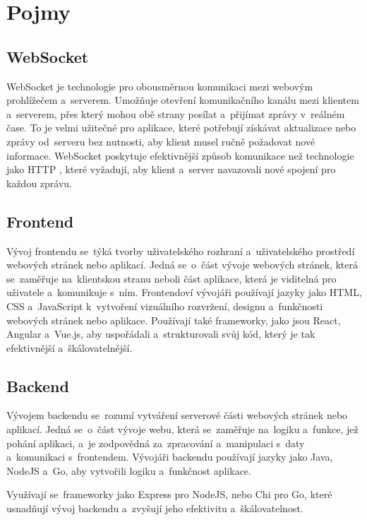 \setlength{\headheight}{15.04742pt}
\section{Pojmy}

\subsection{WebSocket}\label{websocket} WebSocket \cite{websocket} je technologie pro obousměrnou komunikaci mezi webovým prohlížečem a~serverem. Umožňuje otevření komunikačního kanálu mezi klientem a~serverem, přes který mohou obě strany posílat a~přijímat zprávy v~reálném čase. To je velmi užitečné pro aplikace, které potřebují získávat aktualizace nebo zprávy od~serveru bez nutnosti, aby klient musel ručně požadovat nové informace. WebSocket poskytuje efektivnější způsob komunikace než technologie jako HTTP \cite{httpVSwebsocket}, které vyžadují, aby klient a~server navazovali nové spojení pro každou zprávu.
\newpage
\subsection{Frontend} Vývoj frontendu se~týká tvorby uživatelského rozhraní a~uživatelského prostředí webových stránek nebo aplikací. Jedná se~o~část vývoje webových stránek, která se~zaměřuje na~klientskou stranu neboli část aplikace, která je viditelná pro uživatele a~komunikuje s~ním. Frontendoví vývojáři používají jazyky jako HTML, CSS a~JavaScript k~vytvoření vizuálního rozvržení, designu a~funkčnosti webových stránek nebo aplikace. Používají také frameworky, jako jsou React, Angular a~Vue.js, aby uspořádali a~strukturovali svůj kód, který je tak efektivnější a~škálovatelnější.
\subsection{Backend} Vývojem backendu se~rozumí vytváření serverové části webových stránek nebo aplikací. Jedná se~o~část vývoje webu, která se~zaměřuje na~logiku a~funkce, jež pohání aplikaci, a~je zodpovědná za~zpracování a~manipulaci s~daty a~komunikaci s~frontendem. Vývojáři backendu používají jazyky jako Java, NodeJS a~Go, aby vytvořili logiku a~funkčnost aplikace. \par Využívají se~frameworky jako Express pro NodeJS, nebo Chi pro Go, které usnadňují vývoj backendu a~zvyšují jeho efektivitu a~škálovatelnost.
